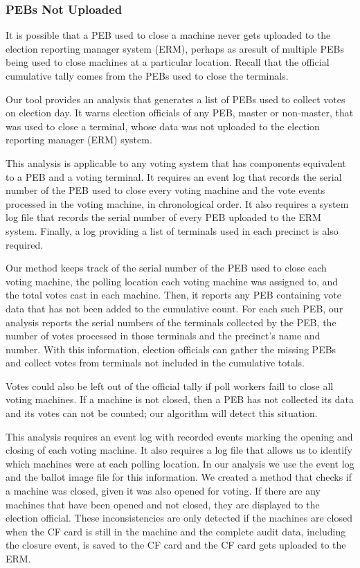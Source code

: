 \subsubsection{PEBs Not Uploaded}
\label{sec:pebs_not_uploaded}
It is possible that a PEB used to close a machine never gets uploaded to the
election reporting manager system (ERM), perhaps as aresult of multiple PEBs
being used to close machines at a particular location. Recall that the official
cumulative tally comes from the PEBs used to close the terminals.

Our
tool provides an analysis that generates a list of PEBs used to collect
votes on election day. It warns election officials of any PEB, master
or non-master, that was used to close a terminal, whose data was not
uploaded to the election reporting manager (ERM) system.  

This analysis is applicable to any voting system that has components
equivalent to a PEB and a voting terminal.  It requires an event log
that records the serial number of the PEB used to close every voting
machine and the vote events processed in the voting machine, in
chronological order. It also requires a system log file that records the
serial number of every PEB uploaded to the ERM 
system. Finally, a log providing a list of terminals used in each
precinct is also required.

Our method keeps track of the serial number of the PEB used to close each voting
machine, the polling location each voting machine was assigned
to, and the total votes cast in each machine. Then, it
reports any PEB containing vote data that has not been added to the cumulative
count.  For each such PEB, our analysis reports the serial numbers of the
terminals collected by the PEB, the number of votes processed in those terminals
and the precinct's name and number. With this information, election officials
can gather the missing PEBs and collect votes from terminals not included in the
cumulative totals.

Votes could also be left out of the official tally if poll workers faill to close
all voting machines. If a machine is not closed, then a PEB has
not collected its data and its votes can not be counted; our algorithm
will  detect this situation.   

This analysis requires an event log with recorded events marking the
opening and closing of each voting machine. It also requires a log
file that allows us to identify which machines were at each polling
location. In our analysis we use the event log and the ballot image
file for this information. We created a method that checks if a
machine was closed, given it was also opened for voting.  
If there are any machines that have been opened and not
closed, they are displayed to the election official.  These
inconsistencies are only detected if the machines are closed when the
CF card is still in the machine and the complete audit data, including
the closure event, is saved to the CF card and the CF card gets uploaded to the
ERM.

